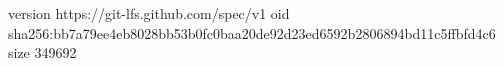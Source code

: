 version https://git-lfs.github.com/spec/v1
oid sha256:bb7a79ee4eb8028bb53b0fc0baa20de92d23ed6592b2806894bd11c5ffbfd4c6
size 349692
